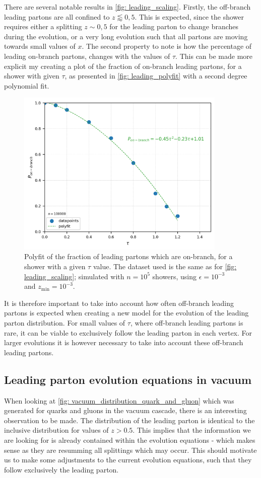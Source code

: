 \documentclass[main.tex]{subfiles}
\begin{document}
There are several notable results in \autoref{fig: leading_scaling}. Firstly, the off-branch leading partons are all confined to \(z\lessapprox 0,5\). This is expected, since the shower requires either a splitting \(z\sim 0,5\) for the leading parton to change branches during the evolution, or a very long evolution such that all partons are moving towards small values of \(x\). The second property to note is how the percentage of leading on-branch partons, changes with the values of \(\tau\). This can be made more explicit my creating a plot of the fraction of on-branch leading partons, for a shower with given \(\tau\), as presented in \autoref{fig: leading_polyfit} with a second degree polynomial fit.
\begin{figure}[htb]
    \centering
    \includegraphics[width=10cm]{pictures/plots/distributions/leading/leading_onbranch_polyfit_100k.png}
    \caption{Polyfit of the fraction of leading partons which are on-branch, for a shower with a given \(\tau\) value. The dataset used is the same as for \autoref{fig: leading_scaling}; simulated with \(n=10^{5}\) showers, using \(\epsilon=10^{-3}\) and \(z_{\text{min}}=10^{-3}\).}
    \label{fig: leading_polyfit}
\end{figure}

It is therefore important to take into account how often off-branch leading partons is expected when creating a new model for the evolution of the leading parton distribution. For small values of \(\tau\), where off-branch leading partons is rare, it can be viable to exclusively follow the leading parton in each vertex. For larger evolutions it is however necessary to take into account these off-branch leading partons.

\subsection{Leading parton evolution equations in vacuum}
When looking at \autoref{fig: vacuum_distribution_quark_and_gluon} which was generated for quarks and gluons in the vacuum cascade, there is an interesting observation to be made. The distribution of the leading parton is identical to the inclusive distribution for values of \(z>0.5\). This implies that the information we are looking for is already contained within the evolution equations - which makes sense as they are resumming all splittings which may occur. This should motivate us to make some adjustments to the current evolution equations, such that they follow exclusively the leading parton.
\end{document}
